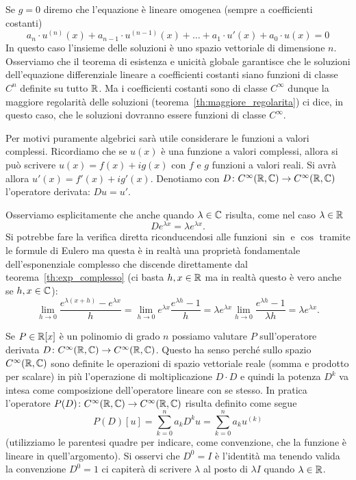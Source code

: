Se $g=0$ diremo che l'equazione è lineare omogenea (sempre a coefficienti costanti)
\begin{equation}\label{eq:edo_lineare_omogenea_coeff_costanti}
  a_n \cdot u^{(n)}(x) + a_{n-1} \cdot u^{(n-1)}(x) + \dots + a_1 \cdot u'(x) + a_0 \cdot u(x) = 0 
\end{equation}
In questo caso l'insieme delle soluzioni è uno spazio vettoriale di dimensione $n$.
Osserviamo che il teorema di esistenza e unicità globale garantisce che le soluzioni 
dell'equazione differenziale lineare a coefficienti costanti siano funzioni di 
classe $C^n$ definite su tutto ${\mathbb R}$. 
Ma i coefficienti costanti sono di classe $C^\infty$ dunque la maggiore regolarità delle soluzioni
(teorema~\ref{th:maggiore_regolarita}) 
ci dice, in questo caso, che le soluzioni dovranno essere funzioni di classe $C^\infty$.

Per motivi puramente algebrici sarà utile considerare le funzioni a valori complessi.
Ricordiamo che se $u(x)$ è una funzione a valori complessi,
allora si può scrivere $u(x) = f(x) + i g(x)$ con $f$ e $g$ funzioni a valori reali.
Si avrà allora $u'(x) = f'(x) + ig'(x)$.
Denotiamo con $D \colon C^\infty({\mathbb R}, {\mathbb C})\to C^\infty({\mathbb R}, {\mathbb C})$ l'operatore derivata: $D u = u'$.

Osserviamo esplicitamente che anche quando $\lambda \in {\mathbb C}$ risulta,
come nel caso $\lambda\in {\mathbb R}$
\begin{equation}\label{eq:499375}
  D e^{\lambda x} = \lambda e^{\lambda x}.
\end{equation}
Si potrebbe fare la verifica diretta riconducendosi alle funzioni $\sin$ e $\cos$
tramite le formule di Eulero ma questa
è in realtà una proprietà fondamentale dell'esponenziale complesso
che discende direttamente dal teorema~\ref{th:exp_complesso} (ci basta $h,x\in {\mathbb R}$ ma in realtà 
questo è vero anche se $h,x\in {\mathbb C}$):
\[
 \lim_{h\to 0} \frac{e^{\lambda(x+h)}-e^{\lambda x}}{h}
 = \lim_{h\to 0} e^{\lambda x}\frac{e^{\lambda h}-1}{h}
 = \lambda e^{\lambda x} \lim_{h\to 0}\frac{e^{\lambda h}-1}{\lambda h}
 = \lambda e^{\lambda x}.
\]

Se $P\in {\mathbb R}[x]$ è un polinomio di grado $n$
possiamo valutare $P$ sull'operatore
derivata $D\colon C^\infty({\mathbb R},{\mathbb C})\to C^\infty({\mathbb R},{\mathbb C})$.
Questo ha senso perché sullo spazio $C^\infty({\mathbb R},{\mathbb C})$
sono definite le operazioni di spazio vettoriale reale
(somma e prodotto per scalare) in più l'operazione
di moltiplicazione $D\cdot D$ e quindi la potenza
$D^k$ va intesa come composizione dell'operatore
lineare con se stesso.
In pratica l'operatore
$P(D)\colon C^\infty({\mathbb R},{\mathbb C}) \to C^\infty({\mathbb R},{\mathbb C})$
risulta definito come segue
\[
  P(D)[u] = \sum_{k=0}^n a_k D^k u = \sum_{k=0}^n a_k u^{(k)}
\]
(utilizziamo le parentesi quadre per indicare, come convenzione,
che la funzione è lineare in quell'argomento).
Si osservi che $D^0 = I$ è l'identità ma tenendo valida
la convenzione $D^0 = 1$ ci capiterà di scrivere
$\lambda$ al posto di $\lambda I$ quando $\lambda\in {\mathbb R}$.

